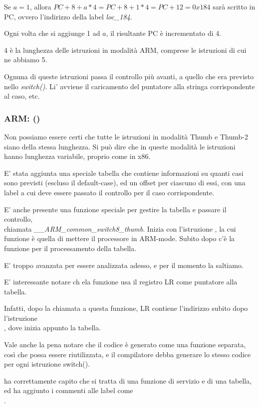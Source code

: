 Se $a=1$, allora $PC+8+a*4 = PC+8+1*4 = PC+12 = 0x184$ sarà scritto in \ac{PC}, ovvero l'indirizzo della label \emph{loc\_184}.

Ogni volta che si aggiunge 1 ad $a$, il risultante \ac{PC} è incrementato di 4.

4 è la lunghezza delle istruzioni in modalità ARM, comprese le istruzioni  di cui ne abbiamo 5.

Ognuna di queste istruzioni  passa il controllo più avanti, a quello che era previsto nello \emph{switch()}.
Li' avviene il caricamento del puntatore alla stringa corrispondente al caso, etc.

\subsubsection{ARM: \OptimizingKeilVI (\ThumbMode)}




Non possiamo essere certi che tutte le istruzioni in modalità Thumb e Thumb-2 siano della stessa lunghezza. Si può dire
che in queste modalità le istruzioni hanno lunghezza variabile, proprio come in x86.


E' stata aggiunta una speciale tabella che contiene informazioni su quanti casi sono previsti (escluso il default-case),
ed un offset per ciascuno di essi, con una label a cui deve essere passato il controllo per il caso corrispondente.



E' anche presente una funzione speciale per gestire la tabella e passare il controllo, \\
chiamata \emph{\_\_ARM\_common\_switch8\_thumb}. 
Inizia con l'istruzione , la cui funzione è quella di mettere il processore in ARM-mode.
Subito dopo c'è la funzione per il processamento della tabella.

E' troppo avanzata per essere analizzata adesso, e per il momento la saltiamo.


E' interessante notare ch ela funzione usa il registro \ac{LR} come puntatore alla tabella.

Infatti, dopo la chiamata a questa funzione, \ac{LR} contiene l'indirizzo subito dopo l'istruzione\\
, dove inizia appunto la tabella.

Vale anche la pena notare che il codice è generato come una funzione separata, così che possa essere riutilizzata, e il compilatore
debba generare lo stesso codice per ogni istruzione switch().

\IDA ha correttamente capito che si tratta di una funzione di servizio e di una tabella, ed ha aggiunto i commenti alle label come\\
.

